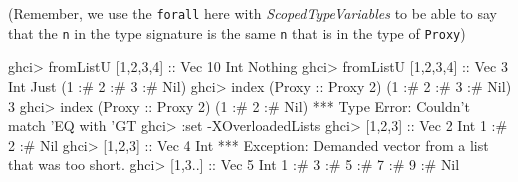 \documentclass[]{article}
\newenvironment{Shaded}{}{}
\newcommand{\DataTypeTok}[1]{\textcolor[rgb]{0.56,0.13,0.00}{#1}}
\newcommand{\DecValTok}[1]{\textcolor[rgb]{0.25,0.63,0.44}{#1}}
\newcommand{\FunctionTok}[1]{\textcolor[rgb]{0.02,0.16,0.49}{#1}}
\newcommand{\NormalTok}[1]{#1}
\newcommand{\OtherTok}[1]{\textcolor[rgb]{0.00,0.44,0.13}{#1}}
\begin{document}
(Remember, we use the \texttt{forall} here with \emph{ScopedTypeVariables} to be
able to say that the \texttt{n} in the type signature is the same \texttt{n}
that is in the type of \texttt{Proxy})

\begin{Shaded}
\begin{Highlighting}[]
\NormalTok{ghci}\FunctionTok{>}\NormalTok{ fromListU [}\DecValTok{1}\NormalTok{,}\DecValTok{2}\NormalTok{,}\DecValTok{3}\NormalTok{,}\DecValTok{4}\NormalTok{]}\OtherTok{ ::} \DataTypeTok{Vec} \DecValTok{10} \DataTypeTok{Int}
\DataTypeTok{Nothing}
\NormalTok{ghci}\FunctionTok{>}\NormalTok{ fromListU [}\DecValTok{1}\NormalTok{,}\DecValTok{2}\NormalTok{,}\DecValTok{3}\NormalTok{,}\DecValTok{4}\NormalTok{]}\OtherTok{ ::} \DataTypeTok{Vec} \DecValTok{3} \DataTypeTok{Int}
\DataTypeTok{Just}\NormalTok{ (}\DecValTok{1} \FunctionTok{:#} \DecValTok{2} \FunctionTok{:#} \DecValTok{3} \FunctionTok{:#} \DataTypeTok{Nil}\NormalTok{)}
\NormalTok{ghci}\FunctionTok{>}\NormalTok{ index (}\DataTypeTok{Proxy}\OtherTok{ ::} \DataTypeTok{Proxy} \DecValTok{2}\NormalTok{) (}\DecValTok{1} \FunctionTok{:#} \DecValTok{2} \FunctionTok{:#} \DecValTok{3} \FunctionTok{:#} \DataTypeTok{Nil}\NormalTok{)}
\DecValTok{3}
\NormalTok{ghci}\FunctionTok{>}\NormalTok{ index (}\DataTypeTok{Proxy}\OtherTok{ ::} \DataTypeTok{Proxy} \DecValTok{2}\NormalTok{) (}\DecValTok{1} \FunctionTok{:#} \DecValTok{2} \FunctionTok{:#} \DataTypeTok{Nil}\NormalTok{)}
\FunctionTok{***} \DataTypeTok{Type} \DataTypeTok{Error}\FunctionTok{:} \DataTypeTok{Couldn't}\NormalTok{ match '}\DataTypeTok{EQ}\NormalTok{ with '}\DataTypeTok{GT}
\NormalTok{ghci}\FunctionTok{>} \FunctionTok{:}\NormalTok{set }\FunctionTok{-}\DataTypeTok{XOverloadedLists}
\NormalTok{ghci}\FunctionTok{>}\NormalTok{ [}\DecValTok{1}\NormalTok{,}\DecValTok{2}\NormalTok{,}\DecValTok{3}\NormalTok{]}\OtherTok{ ::} \DataTypeTok{Vec} \DecValTok{2} \DataTypeTok{Int}
\DecValTok{1} \FunctionTok{:#} \DecValTok{2} \FunctionTok{:#} \DataTypeTok{Nil}
\NormalTok{ghci}\FunctionTok{>}\NormalTok{ [}\DecValTok{1}\NormalTok{,}\DecValTok{2}\NormalTok{,}\DecValTok{3}\NormalTok{]}\OtherTok{ ::} \DataTypeTok{Vec} \DecValTok{4} \DataTypeTok{Int}
\FunctionTok{***} \DataTypeTok{Exception}\FunctionTok{:} \DataTypeTok{Demanded}\NormalTok{ vector from a list that was too short}\FunctionTok{.}
\NormalTok{ghci}\FunctionTok{>}\NormalTok{ [}\DecValTok{1}\NormalTok{,}\DecValTok{3}\FunctionTok{..}\NormalTok{]}\OtherTok{ ::} \DataTypeTok{Vec} \DecValTok{5} \DataTypeTok{Int}
\DecValTok{1} \FunctionTok{:#} \DecValTok{3} \FunctionTok{:#} \DecValTok{5} \FunctionTok{:#} \DecValTok{7} \FunctionTok{:#} \DecValTok{9} \FunctionTok{:#} \DataTypeTok{Nil}
\end{Highlighting}
\end{Shaded}
\end{document}
